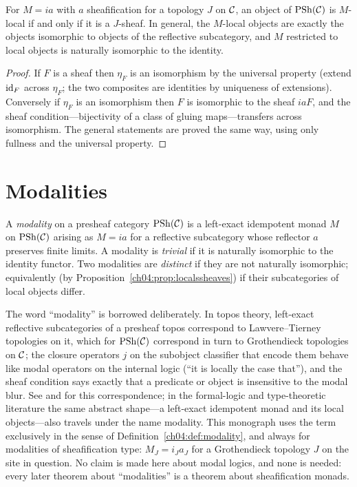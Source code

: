 \begin{proposition}\label{ch04:prop:localssheaves}
For $M=ia$ with $a$ sheafification for a topology $J$ on $\mathcal{C}$, an object of
$\mathrm{PSh}(\mathcal{C})$ is $M$-local if and only if it is a $J$-sheaf. In general, the
$M$-local objects are exactly the objects isomorphic to objects of the
reflective subcategory, and $M$ restricted to local objects is naturally
isomorphic to the identity.
\end{proposition}

\begin{proof}
If $F$ is a sheaf then $\eta_F$ is an isomorphism by the universal property
(extend $\mathrm{id}_F$ across $\eta_F$; the two composites are identities by
uniqueness of extensions). Conversely if $\eta_F$ is an isomorphism then $F$
is isomorphic to the sheaf $iaF$, and the sheaf condition---bijectivity of a
class of gluing maps---transfers across isomorphism. The general statements
are proved the same way, using only fullness and the universal property.
\end{proof}

\section{Modalities}\label{ch04:sec:modalities}

\begin{definition}[Modality]\label{ch04:def:modality}
A \emph{modality} on a presheaf category $\mathrm{PSh}(\mathcal{C})$ is a left-exact
idempotent monad $M$ on $\mathrm{PSh}(\mathcal{C})$ arising as $M=ia$ for a reflective
subcategory whose reflector $a$ preserves finite limits. A modality is
\emph{trivial} if it is naturally isomorphic to the identity functor. Two
modalities are \emph{distinct} if they are not naturally isomorphic;
equivalently (by Proposition~\ref{ch04:prop:localssheaves}) if their
subcategories of local objects differ.
\end{definition}

The word ``modality'' is borrowed deliberately. In topos theory, left-exact
reflective subcategories of a presheaf topos correspond to Lawvere--Tierney
topologies on it, which for $\mathrm{PSh}(\mathcal{C})$ correspond in turn to Grothendieck
topologies on $\mathcal{C}$; the closure operators $j$ on the subobject classifier
that encode them behave like modal operators on the internal logic (``it is
locally the case that''), and the sheaf condition says exactly that a
predicate or object is insensitive to the modal blur. See
\cite[Chap.~V]{maclane} and \cite{johnstone} for this correspondence; in the
formal-logic and type-theoretic literature the same abstract shape---a
left-exact idempotent monad and its local objects---also travels under the
name modality. This monograph uses the term exclusively in the sense of
Definition~\ref{ch04:def:modality}, and always for modalities of
sheafification type: $M_J=i_Ja_J$ for a Grothendieck topology $J$ on the site
in question. No claim is made here about modal logics, and none is needed:
every later theorem about ``modalities'' is a theorem about sheafification
monads.

